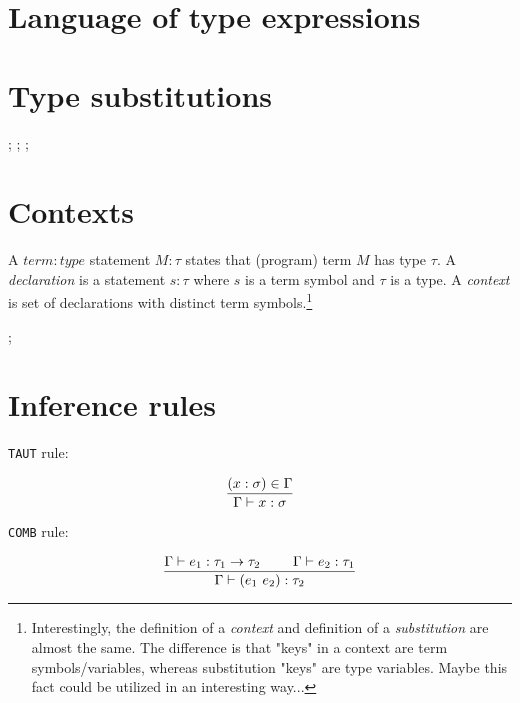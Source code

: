 \documentclass[a4paper,oneside]{memoir}
\begin{document}


\section{Language of type expressions}


\section{Type substitutions}

 ;  ;  ; 

\section{Contexts}

\begin{definition}
A $\mathit{term:type}$ statement $\mathit{M}:\mathit{\tau}$ states that (program) term $M$ has type $\tau$.   
A \textit{declaration} is a statement $s : \tau$ where $s$ is a term symbol and $\tau$ is a type.
A \textit{context} is set of declarations with distinct term symbols.\footnote{Interestingly, the definition of a \textit{context} and definition of a \textit{substitution} are almost the same. The difference is that "keys" in a context are term symbols/variables, whereas substitution "keys" are type variables. Maybe this fact could be utilized in an interesting way...}
\end{definition}



 ; 




\section{Inference rules}

\texttt{TAUT} rule:

$$\dfrac{(x : \sigma) \in \Gamma}{ \Gamma \vdash x : \sigma}$$

\texttt{COMB} rule:

$$\dfrac{\Gamma \vdash e_1 : \tau_1 \rightarrow \tau_2 ~ ~ ~ ~ ~ ~ ~ \Gamma \vdash e_2 : \tau_1}{\Gamma \vdash (e_1~e_2) : \tau_2}$$
\end{document}
